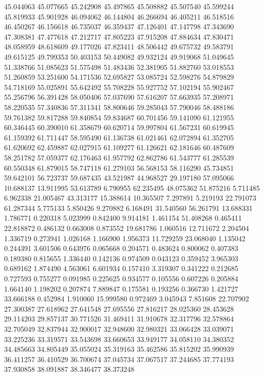 45.044063
45.077665
45.242908
45.497865
45.508882
45.507540
45.599244
45.819933
45.901928
46.094062
46.144804
46.266694
46.405211
46.518516
46.450267
46.156618
46.735037
46.359437
47.126401
47.147798
47.343690
47.308381
47.477618
47.212717
47.805223
47.915208
47.884634
47.830471
48.058959
48.618609
49.177026
47.823411
48.506442
49.675732
49.583791
49.615125
49.799353
50.403153
50.449082
49.932124
49.919068
51.049645
51.338766
51.085623
51.575498
51.483436
52.381905
51.882760
53.018553
51.260859
53.251600
54.171536
52.695827
53.085724
52.598276
54.879829
54.718169
55.025891
55.642492
55.708228
55.927752
57.102194
55.902467
55.256796
56.391428
58.050406
57.037690
57.616207
57.663935
57.208971
58.220535
57.340836
57.311341
58.800646
59.285043
57.790046
58.488186
59.761382
59.817288
59.840854
59.834687
60.701456
59.141090
61.121955
60.346445
60.390010
61.358679
60.620714
59.997804
61.567231
60.619945
61.159392
61.711447
58.595490
61.136738
61.021461
62.072894
61.352705
61.620692
62.459887
62.027915
61.109277
61.126621
62.181646
60.487609
58.251782
57.059377
62.176463
61.957792
62.862786
61.543777
61.285539
60.550348
61.879015
58.747118
61.279103
56.568153
58.116290
45.734851
59.642101
56.723737
59.687435
43.521987
44.968527
29.197180
57.095066
10.688137
13.911995
53.613789
6.790955
62.235495
48.075362
51.875216
5.711485
6.962338
21.005467
43.313177
15.388614
10.365507
7.297891
5.219193
22.791073
61.287344
5.775133
5.850426
9.270882
6.168491
31.540560
56.261791
13.688331
1.786771
0.220318
5.023999
0.842400
9.914181
1.461154
51.408268
0.465411
22.818872
0.486132
0.663008
0.873552
19.681786
1.060516
12.711672
2.204504
1.336719
0.273941
1.026168
1.166900
1.956373
11.729259
23.068040
1.135042
0.244391
3.601506
0.643976
0.065668
0.204571
0.483624
0.800062
0.407383
0.189380
0.815655
1.336440
0.142136
0.974509
0.043123
0.359452
3.965303
0.689162
1.874490
4.563061
6.601934
0.157410
3.319307
0.341222
0.212685
0.727593
0.755277
0.091985
0.225625
0.934577
0.105556
0.607226
0.205884
1.664140
1.198202
0.207874
7.889847
0.175581
0.193256
0.366730
1.421727
33.666188
0.452984
1.910060
15.999580
0.972469
3.045943
7.851608
22.707902
27.300387
27.618962
27.641548
27.695556
27.816217
28.025360
28.453628
29.114203
29.857137
30.771526
31.469411
31.910678
32.317796
32.578864
32.705049
32.837944
32.900017
32.948600
32.980321
33.066428
33.039071
33.225236
33.319571
33.543698
33.660653
33.949177
34.058110
34.380352
34.485663
34.805449
35.055024
35.319163
35.462586
35.815202
35.990939
36.411257
36.410529
36.700674
37.045734
37.067517
37.244685
37.774193
37.930858
38.091887
38.346477
38.373248
